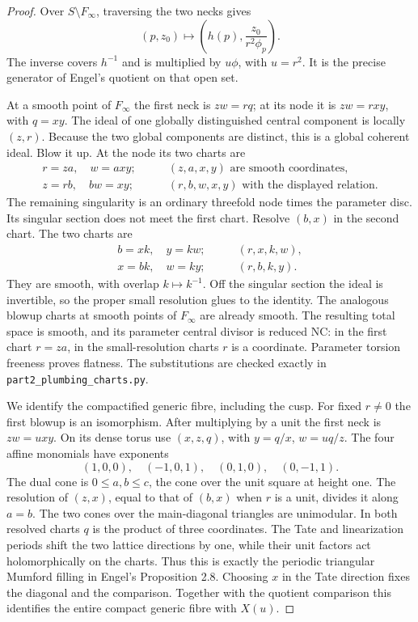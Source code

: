 \begin{proof}
Over $S\setminus F_\infty$, traversing the two necks gives
\[
 (p,z_0)\longmapsto\left(h(p),\frac{z_0}{r^2\phi_p}\right).
\]
The inverse covers $h^{-1}$ and is multiplied by $u\phi$, with $u=r^2$. It is the precise generator of Engel's quotient on that open set.

At a smooth point of $F_\infty$ the first neck is $zw=rq$; at its node it is $zw=rxy$, with $q=xy$. The ideal of one globally distinguished central component is locally $(z,r)$. Because the two global components are distinct, this is a global coherent ideal. Blow it up. At the node its two charts are
\begin{align*}
 r=za,\quad w=axy;&\qquad (z,a,x,y)\text{ are smooth coordinates},\\
 z=rb,\quad bw=xy;&\qquad (r,b,w,x,y)\text{ with the displayed relation}.
\end{align*}
The remaining singularity is an ordinary threefold node times the parameter disc. Its singular section does not meet the first chart. Resolve $(b,x)$ in the second chart. The two charts are
\begin{align*}
 b=xk,\quad y=kw;&\qquad (r,x,k,w),\\
 x=bk,\quad w=ky;&\qquad (r,b,k,y).
\end{align*}
They are smooth, with overlap $k\mapsto k^{-1}$. Off the singular section the ideal is invertible, so the proper small resolution glues to the identity. The analogous blowup charts at smooth points of $F_\infty$ are already smooth. The resulting total space is smooth, and its parameter central divisor is reduced NC: in the first chart $r=za$, in the small-resolution charts $r$ is a coordinate. Parameter torsion freeness proves flatness. The substitutions are checked exactly in \texttt{part2\_plumbing\_charts.py}.

We identify the compactified generic fibre, including the cusp. For fixed $r\ne0$ the first blowup is an isomorphism. After multiplying by a unit the first neck is $zw=u xy$. On its dense torus use $(x,z,q)$, with $y=q/x$, $w=uq/z$. The four affine monomials have exponents
\[
 (1,0,0),\quad(-1,0,1),\quad(0,1,0),\quad(0,-1,1).
\]
The dual cone is $0\le a,b\le c$, the cone over the unit square at height one. The resolution of $(z,x)$, equal to that of $(b,x)$ when $r$ is a unit, divides it along $a=b$. The two cones over the main-diagonal triangles are unimodular. In both resolved charts $q$ is the product of three coordinates. The Tate and linearization periods shift the two lattice directions by one, while their unit factors act holomorphically on the charts. Thus this is exactly the periodic triangular Mumford filling in Engel's Proposition 2.8. Choosing $x$ in the Tate direction fixes the diagonal and the comparison. Together with the quotient comparison this identifies the entire compact generic fibre with $X(u)$.


\end{proof}
